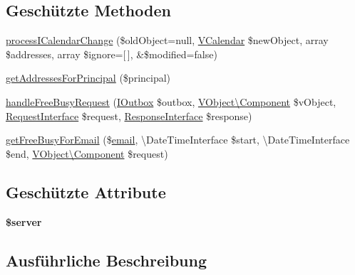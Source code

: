 \subsection*{Geschützte Methoden}
\begin{DoxyCompactItemize}
\item 
\mbox{\hyperlink{class_sabre_1_1_cal_d_a_v_1_1_schedule_1_1_plugin_a98d73b8a4ffd009a843ab94ef517998e}{process\+I\+Calendar\+Change}} (\$old\+Object=null, \mbox{\hyperlink{class_sabre_1_1_v_object_1_1_component_1_1_v_calendar}{V\+Calendar}} \$new\+Object, array \$addresses, array \$ignore=\mbox{[}$\,$\mbox{]}, \&\$modified=false)
\item 
\mbox{\hyperlink{class_sabre_1_1_cal_d_a_v_1_1_schedule_1_1_plugin_a6929b09c0d61e43ff51c8381d951bde1}{get\+Addresses\+For\+Principal}} (\$principal)
\item 
\mbox{\hyperlink{class_sabre_1_1_cal_d_a_v_1_1_schedule_1_1_plugin_af9d9f731ec036d8f8adc4af8b8297be5}{handle\+Free\+Busy\+Request}} (\mbox{\hyperlink{interface_sabre_1_1_cal_d_a_v_1_1_schedule_1_1_i_outbox}{I\+Outbox}} \$outbox, \mbox{\hyperlink{class_sabre_1_1_v_object_1_1_component}{V\+Object\textbackslash{}\+Component}} \$v\+Object, \mbox{\hyperlink{interface_sabre_1_1_h_t_t_p_1_1_request_interface}{Request\+Interface}} \$request, \mbox{\hyperlink{interface_sabre_1_1_h_t_t_p_1_1_response_interface}{Response\+Interface}} \$response)
\item 
\mbox{\hyperlink{class_sabre_1_1_cal_d_a_v_1_1_schedule_1_1_plugin_a7c3de76ff98827569c641087fd2f3eb9}{get\+Free\+Busy\+For\+Email}} (\$\mbox{\hyperlink{classemail}{email}}, \textbackslash{}Date\+Time\+Interface \$start, \textbackslash{}Date\+Time\+Interface \$end, \mbox{\hyperlink{class_sabre_1_1_v_object_1_1_component}{V\+Object\textbackslash{}\+Component}} \$request)
\end{DoxyCompactItemize}
\subsection*{Geschützte Attribute}
\begin{DoxyCompactItemize}
\item 
\mbox{\label{class_sabre_1_1_cal_d_a_v_1_1_schedule_1_1_plugin_aff3b5db0eb6c932c81f737ec8675f662}} 
{\bfseries \$server}
\end{DoxyCompactItemize}


\subsection{Ausführliche Beschreibung}
